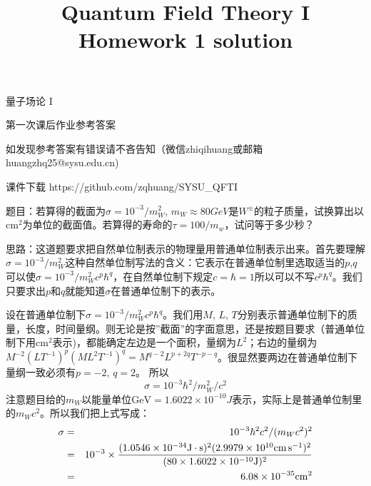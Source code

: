 \documentclass[CJK]{beamer}
\title{Quantum Field Theory I \\ Homework 1 solution}
\author{}
\date{}
\begin{document}
\begin{frame}
 
\begin{center}
\begin{Large}
\bch
量子场论 I 

{\vskip 0.3in}

第一次课后作业参考答案
\skipline
\skipline

如发现参考答案有错误请不吝告知（微信zhiqihuang或邮箱huangzhq25@sysu.edu.cn)
\ech
\end{Large}
\end{center}

\vskip 0.2in

\bch
课件下载
\ech
https://github.com/zqhuang/SYSU\_QFTI

\end{frame}

\begin{frame}
\bch
题目：若算得的截面为$\sigma = 10^{-3}/m_W^2$, $m_W \approx 80 GeV$是$W^{\pm}$的粒子质量，试换算出以$\mathrm{cm}^2$为单位的截面值。若算得的寿命的$\tau = 100/m_w$，试问等于多少秒？

\skipline
思路：这道题要求把自然单位制表示的物理量用普通单位制表示出来。首先要理解$\sigma = 10^{-3}/m_W^2$这种自然单位制写法的含义：它表示在普通单位制里选取适当的$p$,$q$可以使$\sigma = 10^{-3}/m_W^2 c^p\hbar^q$，在自然单位制下规定$c=\hbar=1$所以可以不写$c^p\hbar^q$。我们只要求出$p$和$q$就能知道$\sigma$在普通单位制下的表示。

\ech
\end{frame}

\begin{frame}
\bch
设在普通单位制下$\sigma = 10^{-3}/m_W^2 c^p \hbar^q$。我们用$M$, $L$, $T$分别表示普通单位制下的质量，长度，时间量纲。则无论是按”截面”的字面意思，还是按题目要求（普通单位制下用$\mathrm{cm}^2$表示)，都能确定左边是一个面积，量纲为$L^2$；右边的量纲为$M^{-2} (LT^{-1})^p(ML^2T^{-1})^q = M^{q-2}L^{p+2q}T^{-p-q}$。很显然要两边在普通单位制下量纲一致必须有$p=-2$, $q=2$。 所以
$$\sigma = 10^{-3}\hbar^2 /m_W^2/c^2$$
注意题目给的$m_W$以能量单位$\mathrm{GeV}=1.6022\times 10^{-10}J$表示，实际上是普通单位制里的$m_Wc^2$。所以我们把上式写成：
\begin{eqnarray}
\sigma &=& 10^{-3}\hbar^2 c^2/(m_Wc^2)^2 \nonumber \\
       &=& 10^{-3}\times \frac{(1.0546 \times 10^{-34} \mathrm{J\cdot s})^2(2.9979\times10^{10}\mathrm{cm}\,\mathrm{s}^{-1})^2}{(80\times 1.6022 \times 10^{-10} \mathrm{J})^2} \nonumber \\
       &=& 6.08\times 10^{-35} \mathrm{cm}^2 \nonumber
\end{eqnarray}
\ech
\end{frame}
\end{document}
